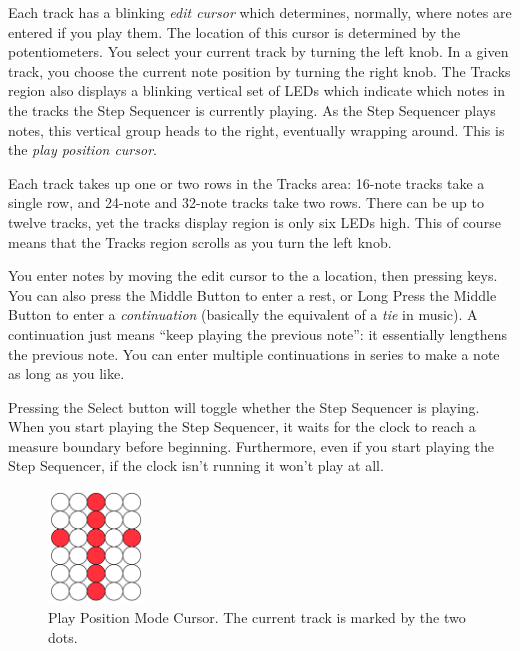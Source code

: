 \documentclass{article}
\begin{document}
Each track has a blinking {\it edit cursor} which determines, normally, where notes are entered if you play them.  The location of this cursor is determined by the potentiometers.  You select your current track by turning the left knob.  In a given track, you choose the current note position by turning the right knob.  The Tracks region also displays a blinking vertical set of LEDs which indicate which notes in the tracks the Step Sequencer is currently playing.  As the Step Sequencer plays notes, this vertical group heads to the right, eventually wrapping around.  This is the {\it play position cursor}.

Each track takes up one or two rows in the Tracks area: 16-note tracks take a single row, and 24-note and 32-note tracks take two rows.    There can be up to twelve tracks, yet the tracks display region is only six LEDs high.  This of course means that  the Tracks region scrolls as you turn the left knob.

You enter notes by moving the edit cursor to the a location, then pressing keys.  You can also press the Middle Button to enter a rest, or Long Press the Middle Button to enter a {\it continuation} (basically the equivalent of a {\it tie} in music).  A continuation just means ``keep playing the previous note'': it essentially lengthens the previous note.  You can enter multiple continuations in series to make a note as long as you like.

Pressing the Select button will toggle whether the Step Sequencer is playing.  When you start playing the Step Sequencer, it waits for the clock to reach a measure boundary before beginning.  Furthermore, even if you start playing the Step Sequencer, if the clock isn't running it won't play at all.

\begin{figure}
\vspace{-3em}\includegraphics[width=1in]{playpositionmode}
\vspace{-1em}
\caption{\small Play Position Mode Cursor.  The current track is marked by the two dots.}\vspace{-2em}
\label{playpositionmode}
\end{figure}
\end{document}
